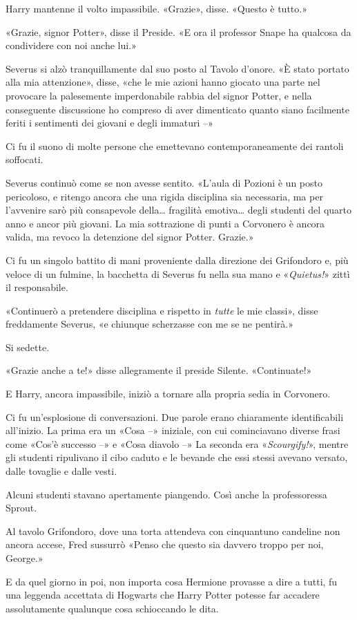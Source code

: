 Harry mantenne il volto impassibile. «Grazie», disse. «Questo è tutto.»

«Grazie, signor Potter», disse il Preside. «E ora il professor Snape ha qualcosa da condividere con noi anche lui.»

Severus si alzò tranquillamente dal suo posto al Tavolo d’onore. «È stato portato alla mia attenzione», disse, «che le mie azioni hanno giocato una parte nel provocare la palesemente imperdonabile rabbia del signor Potter, e nella conseguente discussione ho compreso di aver dimenticato quanto siano facilmente feriti i sentimenti dei giovani e degli immaturi –»

Ci fu il suono di molte persone che emettevano contemporaneamente dei rantoli soffocati.

Severus continuò come se non avesse sentito. «L’aula di Pozioni è un posto pericoloso, e ritengo ancora che una rigida disciplina sia necessaria, ma per l’avvenire sarò più consapevole della… fragilità emotiva… degli studenti del quarto anno e ancor più giovani. La mia sottrazione di punti a Corvonero è ancora valida, ma revoco la detenzione del signor Potter. Grazie.»

Ci fu un singolo battito di mani proveniente dalla direzione dei Grifondoro e, più veloce di un fulmine, la bacchetta di Severus fu nella sua mano e «\textit{Quietus!}» zittì il responsabile.

«Continuerò a pretendere disciplina e rispetto in \textit{tutte} le mie classi», disse freddamente Severus, «e chiunque scherzasse con me se ne pentirà.»

Si sedette.

«Grazie anche a te!» disse allegramente il preside Silente. «Continuate!»

E Harry, ancora impassibile, iniziò a tornare alla propria sedia in Corvonero.

Ci fu un’esplosione di conversazioni. Due parole erano chiaramente identificabili all’inizio. La prima era un «Cosa –» iniziale, con cui cominciavano diverse frasi come «Cos’è successo –» e «Cosa diavolo –» La seconda era «\textit{Scourgify!}», mentre gli studenti ripulivano il cibo caduto e le bevande che essi stessi avevano versato, dalle tovaglie e dalle vesti.

Alcuni studenti stavano apertamente piangendo. Così anche la professoressa Sprout.

Al tavolo Grifondoro, dove una torta attendeva con cinquantuno candeline non ancora accese, Fred sussurrò «Penso che questo sia davvero troppo per noi, George.»

E da quel giorno in poi, non importa cosa Hermione provasse a dire a tutti, fu una leggenda accettata di Hogwarts che Harry Potter potesse far accadere assolutamente qualunque cosa schioccando le dita.



